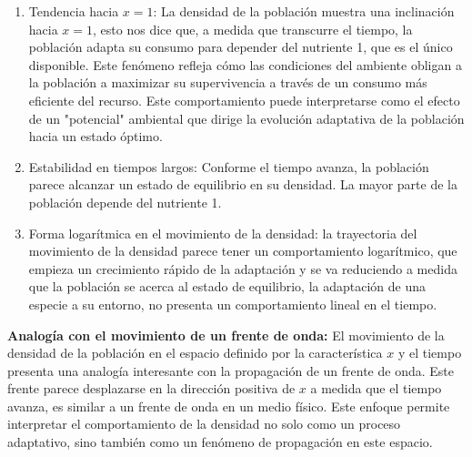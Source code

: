 \begin{enumerate}
	\item Tendencia hacia $x=1$: La densidad de la población muestra una inclinación hacia $x=1$, esto nos dice que, a medida que transcurre el tiempo, la población adapta su consumo para depender del nutriente 1, que es el único disponible. Este fenómeno refleja cómo las condiciones del ambiente obligan a la población a maximizar su supervivencia a través de un consumo más eficiente del recurso. Este comportamiento puede interpretarse como el efecto de un "potencial" ambiental que dirige la evolución adaptativa de la población hacia un estado óptimo.
	\item Estabilidad en tiempos largos: Conforme el tiempo avanza, la población parece alcanzar un estado de equilibrio en su densidad. La mayor parte de la población depende del nutriente 1.
	\item Forma logarítmica en el movimiento de la densidad: la trayectoria del movimiento de la densidad parece tener un comportamiento logarítmico, que empieza un crecimiento rápido de la adaptación y se va reduciendo a medida que la población se acerca al estado de equilibrio, la adaptación de una especie a su entorno, no presenta un comportamiento lineal en el tiempo.
\end{enumerate}

\textbf{Analogía con el movimiento de un frente de onda:} El movimiento de la densidad de la población en el espacio definido por la característica $x$ y el tiempo presenta una analogía interesante con la propagación de un frente de onda. Este frente parece desplazarse en la dirección positiva de $x$ a medida que el tiempo avanza, es similar a un frente de onda en un medio físico. Este enfoque permite interpretar el comportamiento de la densidad no solo como un proceso adaptativo, sino también como un fenómeno de propagación en este espacio.

